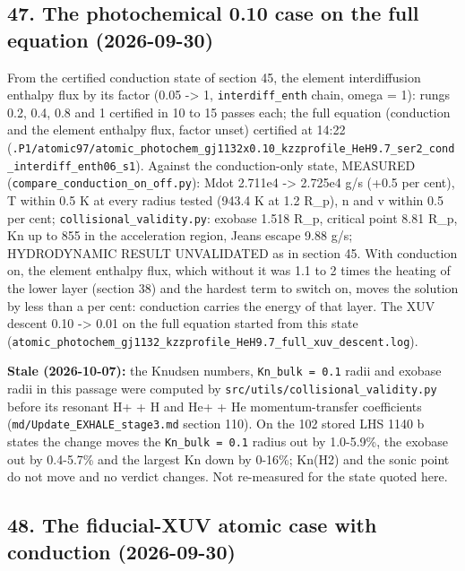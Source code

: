 \documentclass[english,a4paper]{my_memo}
\begin{document}
\subsection{47. The photochemical 0.10 case on the full equation (2026-09-30)}\label{47-the-photochemical-010-case-on-the-full-equation-2026-09-30}

From the certified conduction state of section 45, the element
interdiffusion enthalpy flux by its factor (0.05 -\textgreater{} 1, \texttt{interdiff\_enth}
chain, omega = 1): rungs 0.2, 0.4, 0.8 and 1 certified in 10 to 15 passes
each; the full equation (conduction and the element enthalpy flux, factor
unset) certified at 14:22
(\texttt{.P1/atomic97/atomic\_photochem\_gj1132x0.10\_kzzprofile\_HeH9.7\_ser2\_cond\_interdiff\_enth06\_s1}).
Against the conduction-only state, MEASURED
(\texttt{compare\_conduction\_on\_off.py}): Mdot 2.711e4 -\textgreater{} 2.725e4 g/s (+0.5 per
cent), T within 0.5 K at every radius tested (943.4 K at 1.2 R\_p), n and v
within 0.5 per cent; \texttt{collisional\_validity.py}: exobase 1.518 R\_p, critical
point 8.81 R\_p, Kn up to 855 in the acceleration region, Jeans escape 9.88
g/s; HYDRODYNAMIC RESULT UNVALIDATED as in section 45. With conduction on,
the element enthalpy flux, which without it was 1.1 to 2 times the heating
of the lower layer (section 38) and the hardest term to switch on, moves the
solution by less than a per cent: conduction carries the energy of that
layer. The XUV descent 0.10 -\textgreater{} 0.01 on the full equation started from this
state (\texttt{atomic\_photochem\_gj1132\_kzzprofile\_HeH9.7\_full\_xuv\_descent.log}).

\textbf{Stale (2026-10-07):} the Knudsen numbers, \texttt{Kn\_bulk\ =\ 0.1} radii and exobase radii in this passage were computed by \texttt{src/utils/collisional\_validity.py} before its resonant H+ + H and He+ + He momentum-transfer coefficients (\texttt{md/Update\_EXHALE\_stage3.md} section 110). On the 102 stored LHS 1140 b states the change moves the \texttt{Kn\_bulk\ =\ 0.1} radius out by 1.0-5.9\%, the exobase out by 0.4-5.7\% and the largest Kn down by 0-16\%; Kn(H2) and the sonic point do not move and no verdict changes. Not re-measured for the state quoted here.

\subsection{48. The fiducial-XUV atomic case with conduction (2026-09-30)}\label{48-the-fiducial-xuv-atomic-case-with-conduction-2026-09-30}
\end{document}
